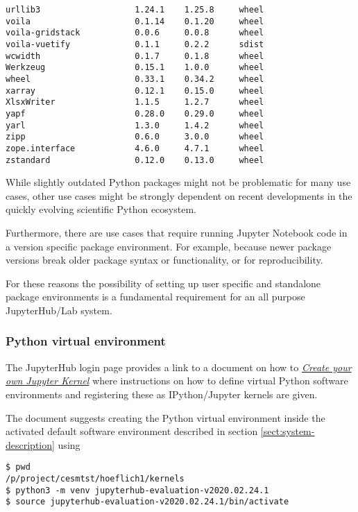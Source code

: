 \begin{verbatim}
urllib3                   1.24.1    1.25.8     wheel
voila                     0.1.14    0.1.20     wheel
voila-gridstack           0.0.6     0.0.8      wheel
voila-vuetify             0.1.1     0.2.2      sdist
wcwidth                   0.1.7     0.1.8      wheel
Werkzeug                  0.15.1    1.0.0      wheel
wheel                     0.33.1    0.34.2     wheel
xarray                    0.12.1    0.15.0     wheel
XlsxWriter                1.1.5     1.2.7      wheel
yapf                      0.28.0    0.29.0     wheel
yarl                      1.3.0     1.4.2      wheel
zipp                      0.6.0     3.0.0      wheel
zope.interface            4.6.0     4.7.1      wheel
zstandard                 0.12.0    0.13.0     wheel
\end{verbatim}
While slightly outdated Python packages might not be problematic for many use cases, other use cases might be strongly dependent on recent developments in the quickly evolving scientific Python ecosystem.

Furthermore, there are use cases that require running Jupyter Notebook code in a version specific package environment.
For example, because newer package versions break older package syntax or functionality, or for reproducibility.

For these reasons the possibility of setting up user specific and standalone package environments is a fundamental requirement for an all purpose JupyterHub/Lab system.

\subsubsection{Python virtual environment}
\label{sect:python-kernel:virtual-environment}

The JupyterHub login page provides a link to a document on how to \href{https://jupyter-jsc.fz-juelich.de/hub/static/files/kernel.html}{\emph{Create your own Jupyter Kernel}} where instructions on how to define virtual Python software environments and registering these as IPython/Jupyter kernels are given.

The document suggests creating the Python virtual environment inside the activated default software environment described in section \ref{sect:system-description} using
%
\begin{verbatim}
$ pwd
/p/project/cesmtst/hoeflich1/kernels
$ python3 -m venv jupyterhub-evaluation-v2020.02.24.1
$ source jupyterhub-evaluation-v2020.02.24.1/bin/activate
\end{verbatim}

